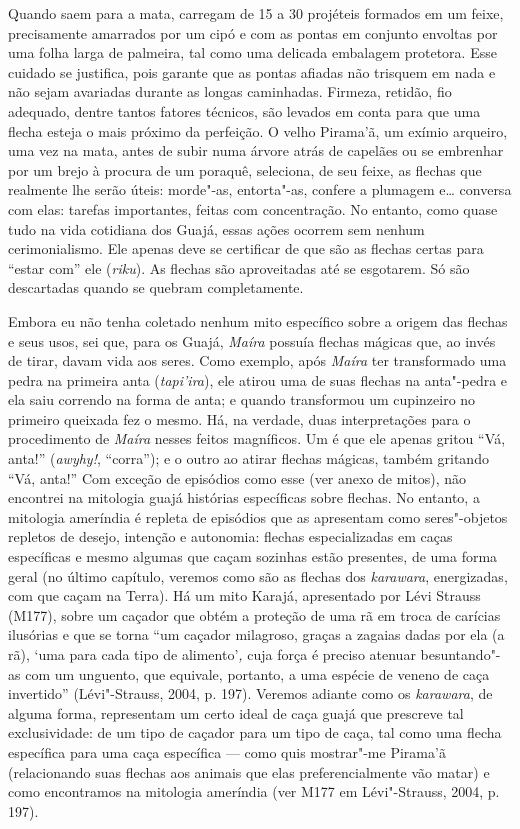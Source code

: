 Quando saem para a mata, carregam de 15 a 30 projéteis formados em um
feixe, precisamente amarrados por um cipó e com as pontas em conjunto
envoltas por uma folha larga de palmeira, tal como uma delicada
embalagem protetora. Esse cuidado se justifica, pois garante que as
pontas afiadas não trisquem em nada e não sejam avariadas durante as
longas caminhadas. Firmeza, retidão, fio adequado, dentre tantos fatores
técnicos, são levados em conta para que uma flecha esteja o mais próximo
da perfeição. O velho Pirama'ã, um exímio arqueiro, uma vez na mata,
antes de subir numa árvore atrás de capelães ou se embrenhar por um
brejo à procura de um poraquê, seleciona, de seu feixe, as flechas que
realmente lhe serão úteis: morde"-as, entorta"-as, confere a plumagem e\ldots{}
conversa com elas: tarefas importantes, feitas com concentração. No
entanto, como quase tudo na vida cotidiana dos Guajá, essas ações
ocorrem sem nenhum cerimonialismo. Ele apenas deve se certificar de que
são as flechas certas para ``estar com'' ele (\emph{riku}). As flechas são
aproveitadas até se esgotarem. Só são descartadas quando se quebram
completamente.

Embora eu não tenha coletado nenhum mito específico sobre a origem das
flechas e seus usos, sei que, para os Guajá, \emph{Maíra} possuía
flechas mágicas que, ao invés de tirar, davam vida aos seres. Como
exemplo, após \emph{Maíra} ter transformado uma pedra na primeira anta
(\emph{tapi'ira}), ele atirou uma de suas flechas na anta"-pedra e ela
saiu correndo na forma de anta; e quando transformou um cupinzeiro no
primeiro queixada fez o mesmo. Há, na verdade, duas interpretações para
o procedimento de \emph{Maíra} nesses feitos magníficos. Um é que ele
apenas gritou ``Vá, anta!'' (\emph{awyhy!}, ``corra''); e o outro ao atirar
flechas mágicas, também gritando ``Vá, anta!'' Com exceção de episódios
como esse (ver anexo de mitos), não encontrei na mitologia guajá
histórias específicas sobre flechas. No entanto, a mitologia ameríndia é
repleta de episódios que as apresentam como seres"-objetos repletos de
desejo, intenção e autonomia: flechas especializadas em caças
específicas e mesmo algumas que caçam sozinhas estão presentes, de uma
forma geral (no último capítulo, veremos como são as flechas dos
\emph{karawara}, energizadas, com que caçam na Terra). Há um mito
Karajá, apresentado por Lévi Strauss (M177), sobre um caçador que obtém
a proteção de uma rã em troca de carícias ilusórias e que se torna ``um
caçador milagroso, graças a zagaias dadas por ela (a rã), `uma para
cada tipo de alimento'\emph{,} cuja força é preciso atenuar
besuntando"-as com um unguento, que equivale, portanto, a uma espécie de
veneno de caça invertido'' (Lévi"-Strauss, 2004, p. 197). Veremos adiante
como os \emph{karawara}, de alguma forma, representam um certo ideal de
caça guajá que prescreve tal exclusividade: de um tipo de caçador para
um tipo de caça, tal como uma flecha específica para uma caça específica
--- como quis mostrar"-me Pirama'ã (relacionando suas flechas aos animais
que elas preferencialmente vão matar) e como encontramos na mitologia
ameríndia (ver M177 em Lévi"-Strauss, 2004, p. 197).

